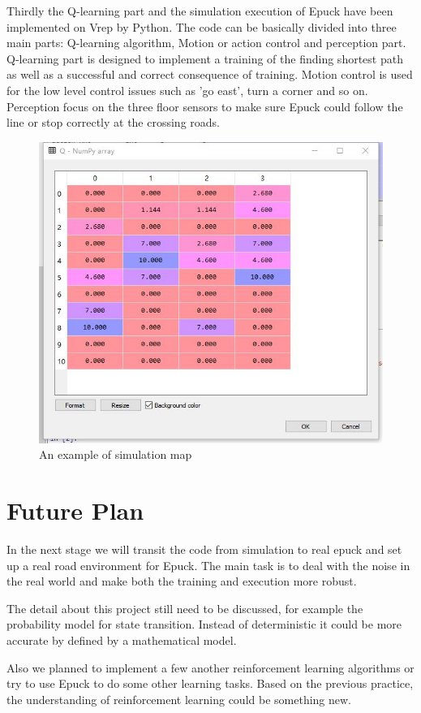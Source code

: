 \documentclass[a4paper, 11pt]{article} %
\begin{document}
Thirdly the Q-learning part and the simulation execution of Epuck have been implemented on Vrep by Python. The code can be basically divided into three main parts: Q-learning algorithm, Motion or action control and perception part. Q-learning part is designed to implement a training of the finding shortest path as well as a successful and correct consequence of training. Motion control is used for the low level control issues such as 'go east', turn a corner and so on. Perception focus on the three floor sensors to make sure Epuck could follow the line or stop correctly at the crossing roads. 
\begin{figure}[tb]
\centering 
\includegraphics[width=0.5\columnwidth]{Qvalue} 
\caption[An example of a floating figure]{An example of simulation map} %
\label{fig:Qvalue} 
\end{figure}

\section{Future Plan}
In the next stage we will transit the code from simulation to real epuck and set up a real road environment for Epuck. The main task is to deal with the noise in the real world and make both the training and execution more robust.


The detail about this project still need to be discussed, for example the probability model for state transition. Instead of deterministic it could be more accurate by defined by a mathematical model.

Also we planned to implement a few another reinforcement learning algorithms or try to use Epuck to do some other learning tasks. Based on the previous practice, the understanding of reinforcement learning could be something new.
\end{document}
